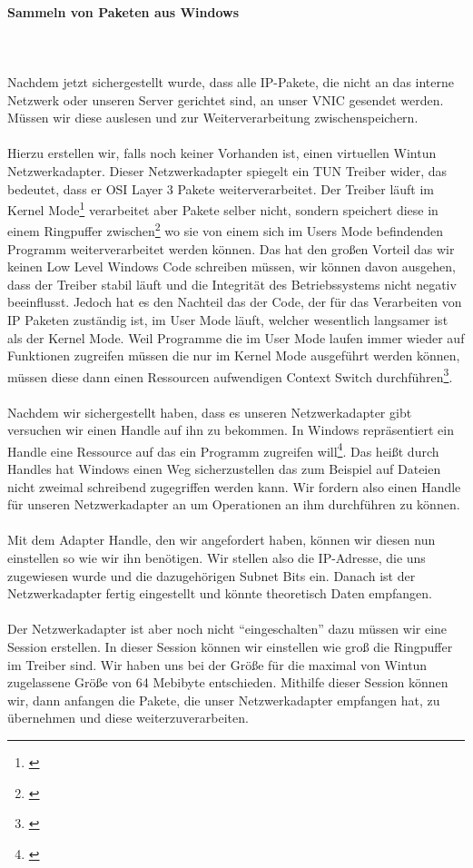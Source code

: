 \paragraph{Sammeln von Paketen aus Windows}
\ \\\\
Nachdem jetzt sichergestellt wurde, dass alle IP-Pakete, die nicht an das interne Netzwerk oder unseren Server gerichtet sind, an unser VNIC gesendet werden. Müssen wir diese auslesen und zur Weiterverarbeitung zwischenspeichern.
\\\\
Hierzu erstellen wir, falls noch keiner Vorhanden ist, einen virtuellen Wintun Netzwerkadapter. Dieser Netzwerkadapter spiegelt ein TUN Treiber wider, das bedeutet, dass er OSI Layer 3 Pakete weiterverarbeitet. Der Treiber läuft im Kernel Mode\footnote[1]{\cite[Vgl.][]{12}} verarbeitet aber Pakete selber nicht, sondern speichert diese in einem Ringpuffer zwischen\footnote[2]{\cite[Vgl.][]{11}} wo sie von einem sich im Users Mode befindenden Programm weiterverarbeitet werden können. Das hat den großen Vorteil das wir keinen Low Level Windows Code schreiben müssen, wir können davon ausgehen, dass der Treiber stabil läuft und die Integrität des Betriebssystems nicht negativ beeinflusst. Jedoch hat es den Nachteil das der Code, der für das Verarbeiten von IP Paketen zuständig ist, im User Mode läuft, welcher wesentlich langsamer ist als der Kernel Mode. Weil Programme die im User Mode laufen immer wieder auf Funktionen zugreifen müssen die nur im Kernel Mode ausgeführt werden können, müssen diese dann einen Ressourcen aufwendigen Context Switch durchführen\footnote[3]{\cite[Vgl.][]{13}}.
\\\\
Nachdem wir sichergestellt haben, dass es unseren Netzwerkadapter gibt versuchen wir einen Handle auf ihn zu bekommen. In Windows repräsentiert ein Handle eine Ressource auf das ein Programm zugreifen will\footnote[4]{\cite[Vgl.][]{14}}. Das heißt durch Handles hat Windows einen Weg sicherzustellen das zum Beispiel auf Dateien nicht zweimal schreibend zugegriffen werden kann. Wir fordern also einen Handle für unseren Netzwerkadapter an um Operationen an ihm durchführen zu können.
\\\\
Mit dem Adapter Handle, den wir angefordert haben, können wir diesen nun einstellen so wie wir ihn benötigen. Wir stellen also die IP-Adresse, die uns zugewiesen wurde und die dazugehörigen Subnet Bits ein. Danach ist der Netzwerkadapter fertig eingestellt und könnte theoretisch Daten empfangen.
\\\\
Der Netzwerkadapter ist aber noch nicht “eingeschalten” dazu müssen wir eine Session erstellen. In dieser Session können wir einstellen wie groß die Ringpuffer im Treiber sind. Wir haben uns bei der Größe für die maximal von Wintun zugelassene Größe von 64 Mebibyte entschieden. Mithilfe dieser Session können wir, dann anfangen die Pakete, die unser Netzwerkadapter empfangen hat, zu übernehmen und diese weiterzuverarbeiten.

